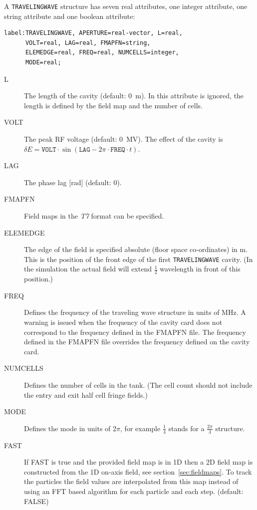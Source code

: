 A \texttt{TRAVELINGWAVE} structure has seven real attributes, one integer attribute, one string attribute and one boolean attribute:
\begin{verbatim}
label:TRAVELINGWAVE, APERTURE=real-vector, L=real,
      VOLT=real, LAG=real, FMAPFN=string,
      ELEMEDGE=real, FREQ=real, NUMCELLS=integer,
      MODE=real;
\end{verbatim}

\begin{description}
\item[L]
  The length of the cavity (default: 0~m). In \opalt this attribute is ignored, the length is defined by the field map and the number of cells.
\item[VOLT]
  The peak RF voltage (default: 0~MV).
  The effect of the cavity is
  $\delta E=\mathtt{VOLT}\cdot\sin(\mathtt{LAG}- 2\pi\cdot\mathtt{FREQ}\cdot t)$.
\item[LAG]
  The phase lag [rad] (default: 0).
\item[FMAPFN]
  Field maps in the {\em T7} format can be specified.
\item[ELEMEDGE]
  The edge of the field is specified absolute (floor space co-ordinates) in m. This is the position of the front edge
  of the first \texttt{TRAVELINGWAVE} cavity. (In the simulation the actual field will extend $\frac{1}{2}$ wavelength
  in front of this position.)
\item[FREQ]
  Defines the frequency of the traveling wave structure in units of MHz. A warning is issued when the frequency of
  the cavity card does not correspond to the frequency defined in the  FMAPFN file. The frequency defined in the FMAPFN
  file overrides the frequency defined on the cavity card. 
\item[NUMCELLS]
  Defines the number of cells in the tank. (The cell count should not include the entry and exit half cell fringe fields.)
\item[MODE]
Defines the mode in units of $2\pi$, for example $\frac{1}{3}$ stands for a $\frac{2 \pi}{3}$ structure.
\item[FAST]
If FAST is true and the provided field map is in 1D then a 2D field map is constructed from the 1D on-axis field, see section~\ref{sec:fieldmaps}. To track the particles the field values are interpolated from this map instead of using an FFT based algorithm for each particle and each step. (default: FALSE)
\end{description}

